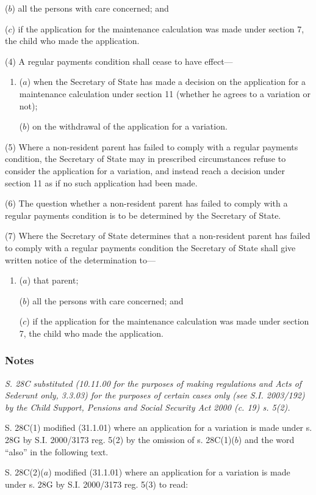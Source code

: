 \documentclass[a4paper]{article}
\newcommand\amendment[1]{\subsubsection*{Notes}{\itshape\frenchspacing\footnotesize #1 \par}}
\begin{document}
{\begin{enumerate}
($b$) all the persons with care concerned; and

($c$) if the application for the maintenance calculation was made under section
7, the child who made the application.
\end{enumerate}

(4) A regular payments condition shall cease to have effect---
\begin{enumerate}\item[]
($a$) when the Secretary of State has made a decision on the application for a
maintenance calculation under section 11 (whether he agrees to a variation
or not);

($b$) on the withdrawal of the application for a variation.
\end{enumerate}

(5) Where a non-resident parent has failed to comply with a regular payments condition, the Secretary of State may in prescribed circumstances refuse to consider the application for a variation, and instead reach a decision under section 11 as if no such application had been made.

(6)
The question whether a non-resident parent has failed to comply with a regular payments condition is to be determined by the Secretary of State.

(7)
Where the Secretary of State determines that a non-resident parent has failed to comply with a regular payments condition the Secretary of State shall give written notice of the determination to---
\begin{enumerate}\item[]
($a$) that parent;

($b$) all the persons with care concerned; and

($c$) if the application for the maintenance calculation was made under section 7, the child who made the application.
\end{enumerate}

\amendment{
S. 28C substituted (10.11.00 for the purposes of making regulations and Acts of Sederunt only, 3.3.03) for the purposes of certain cases only (see S.I. 2003/192) by the Child Support, Pensions and Social Security Act 2000 (c. 19) s. 5(2).

S. 28C(1) modified (31.1.01) where an application for a variation is made under s. 28G by S.I. 2000/3173 reg. 5(2) by the omission of s. 28C(1)($b$) and the word ``also'' in the following text.

S. 28C(2)($a$) modified (31.1.01) where an application for a variation is made under s. 28G by S.I. 2000/3173 reg. 5(3) to read:

}}
\end{document}
